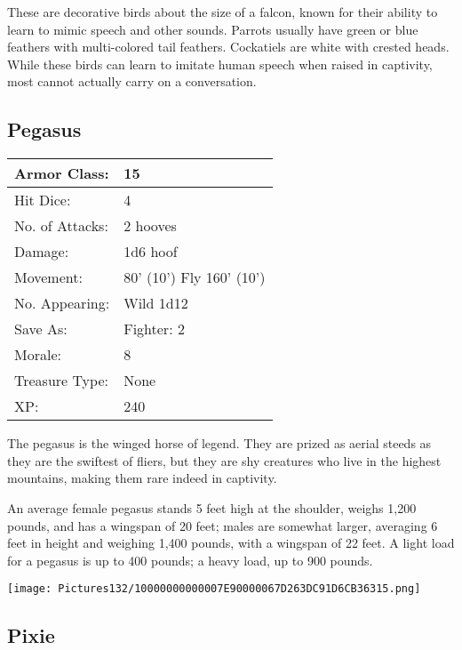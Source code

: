 \documentclass[a4paper,twoside,openany,10pt]{book}
\begin{document}
\begin{multicols}{2}
These are decorative birds about the size of a falcon, known for their ability to learn to mimic speech and other sounds. Parrots usually have green or blue feathers with multi-colored tail feathers. Cockatiels are white with crested heads. While these birds can learn to imitate human speech when raised in captivity, most cannot actually carry on a conversation.

\subsection*{Pegasus}\label{pegasus}

\begin{tabularx}{0.50\textwidth}{@{}lX@{}}
Armor Class: & 15 \\\hline
Hit Dice: & 4 \\\hline
No. of Attacks: & 2 hooves \\\hline
Damage: & 1d6 hoof \\\hline
Movement: & 80' (10') Fly
160' (10') \\\hline
No. Appearing: & Wild 1d12 \\\hline
Save As: & Fighter: 2 \\\hline
Morale: & 8 \\\hline
Treasure Type: & None \\\hline
XP: & 240 \\\hline
\end{tabularx}\medskip

The pegasus is the winged horse of legend. They are prized as aerial steeds as they are the swiftest of fliers, but they are shy creatures who live in the highest mountains, making them rare indeed in captivity. 

An average female pegasus stands 5 feet high at the shoulder, weighs 1,200 pounds, and has a wingspan of 20 feet; males are somewhat larger, averaging 6 feet in height and weighing 1,400 pounds, with a wingspan of 22 feet. A light load for a pegasus is up to 400 pounds; a heavy load, up to 900 pounds.

 \begin{center}
 	\texttt{[image: Pictures132/10000000000007E90000067D263DC91D6CB36315.png]} 
 \end{center}

\subsection*{Pixie}\label{pixie}


\end{multicols}
\end{document}
